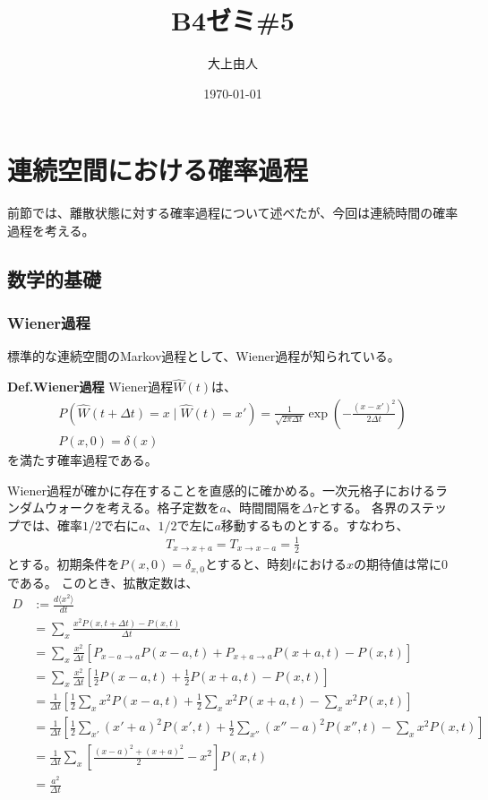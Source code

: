 \documentclass[a4paper,11pt]{jsarticle}
\numberwithin{equation}{section}
\begin{document}
\title{B4ゼミ\#5}
\author{大上由人}
\date{\today}
\maketitle

\setcounter{section}{3}
\section{連続空間における確率過程}
前節では、離散状態に対する確率過程について述べたが、今回は連続時間の確率過程を考える。
\subsection{数学的基礎}
\subsubsection{Wiener過程}
標準的な連続空間のMarkov過程として、Wiener過程が知られている。
\begin{itembox}[l]{\textbf{Def.Wiener過程}}
    Wiener過程$\hat{W}(t)$は、
    \begin{align}
        P(\hat{W}(t+\Delta t)=x \mid \hat{W}(t)=x') = \frac{1}{\sqrt{2\pi \Delta t}} \exp(-\frac{(x-x')^2}{2\Delta t})\\
        P(x,0)=\delta(x)
    \end{align}
    を満たす確率過程である。
\end{itembox}
Wiener過程が確かに存在することを直感的に確かめる。一次元格子におけるランダムウォークを考える。格子定数を$a$、時間間隔を$\Delta \tau$とする。
各界のステップでは、確率$1/2$で右に$a$、$1/2$で左に$a$移動するものとする。すなわち、
\begin{align}
    T_{x \to x+a} = T_{x \to x-a} = \frac{1}{2}
\end{align}
とする。初期条件を$P(x,0)=\delta_{x,0}$とすると、時刻$t$における$x$の期待値は常に0である。
このとき、拡散定数は、
\begin{align}
    D &:= \frac{d\langle x^2 \rangle}{dt} \\
  &= \sum_{x} \frac{ x^2 P(x,t + \Delta t) - P(x,t)}{\Delta t} \\
  &= \sum_{x} \frac{x^2}{\Delta t} \left[ P_{x-a \rightarrow a} P(x - a, t) + P_{x + a \rightarrow a} P(x + a, t) - P(x,t) \right] \\
  &= \sum_{x} \frac{x^2}{\Delta t} \left[ \frac{1}{2} P(x - a, t) + \frac{1}{2} P(x + a, t) - P(x,t) \right] \\
  &= \frac{1}{\Delta t} \left[ \frac{1}{2} \sum_{x} x^2 P(x - a, t) + \frac{1}{2} \sum_{x} x^2 P(x + a, t) - \sum_{x} x^2 P(x,t) \right] \\
  &= \frac{1}{\Delta t} \left[ \frac{1}{2} \sum_{x'} (x' + a)^2 P(x', t) + \frac{1}{2} \sum_{x''} (x'' - a)^2 P(x'', t) - \sum_{x} x^2 P(x,t) \right] \\
  &= \frac{1}{\Delta t} \sum_{x} \left[ \frac{(x - a)^2 + (x + a)^2}{2} - x^2 \right] P(x,t) \\
  &= \frac{a^2}{\Delta t} 
\end{align}
\end{document}
